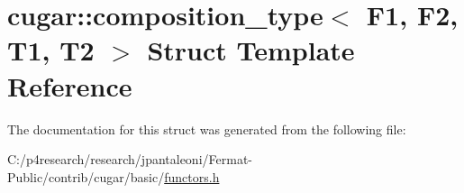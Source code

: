 \hypertarget{structcugar_1_1composition__type}{}\section{cugar\+:\+:composition\+\_\+type$<$ F1, F2, T1, T2 $>$ Struct Template Reference}
\label{structcugar_1_1composition__type}


The documentation for this struct was generated from the following file\+:\begin{DoxyCompactItemize}
\item 
C\+:/p4research/research/jpantaleoni/\+Fermat-\/\+Public/contrib/cugar/basic/\hyperlink{functors_8h}{functors.\+h}\end{DoxyCompactItemize}
